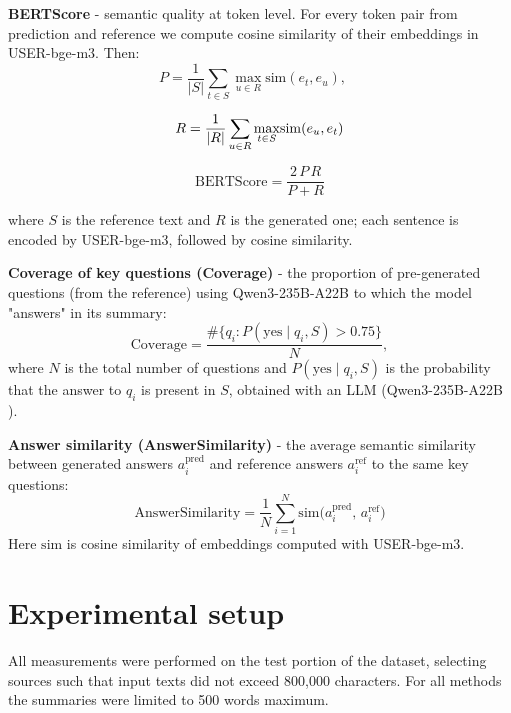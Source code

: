 \documentclass{superfri}
\begin{document}
\textbf{BERTScore} \cite{bertscore} - semantic quality at token level. For every token pair from prediction and reference we compute cosine similarity of their embeddings in USER-bge-m3. Then:
\begin{equation}
P = \frac{1}{|S|}\sum_{t\in S}\max_{u\in R}\!\mathrm{sim}(e_t, e_u),\quad
\end{equation}

\begin{equation}
R = \frac{1}{|R|}\sum_{u\in R}\max_{t\in S}\!\mathrm{sim}(e_u, e_t)\\
\end{equation}

\begin{equation}
\text{BERTScore} = \frac{2\,P\,R}{P+R}
\end{equation}

where \(S\) is the reference text and \(R\) is the generated one; each sentence is encoded by USER-bge-m3,
followed by cosine similarity.

\textbf{Coverage of key questions (Coverage)} - the proportion of pre-generated questions (from the reference) using Qwen3-235B-A22B \cite{qwen3}
to which the model "answers" in its summary:
\begin{equation}
  \text{Coverage} = \frac{\#\{q_i\colon P(\text{yes}\mid q_i,S)\!>\!0.75\}}{N},
\end{equation}
where $N$ is the total number of questions and $P(\text{yes}\mid q_i,S)$ is the probability that the answer to $q_i$ is present in $S$,
obtained with an LLM (Qwen3-235B-A22B \cite{qwen3}).

\textbf{Answer similarity (AnswerSimilarity)} - the average semantic similarity between generated answers $a_i^{\text{pred}}$ and reference answers $a_i^{\text{ref}}$ to the same key questions:
\begin{equation}
  \text{AnswerSimilarity} = \frac{1}{N}\sum_{i=1}^N \mathrm{sim}\bigl(a_i^{\text{pred}},\,a_i^{\text{ref}}\bigr)
\end{equation}
Here $\mathrm{sim}$ is cosine similarity of embeddings computed with USER-bge-m3.

\section{Experimental setup}

All measurements were performed on the test portion of the dataset, selecting sources such that input texts did not exceed 800{,}000 characters.
For all methods the summaries were limited to 500 words maximum.
\end{document}
